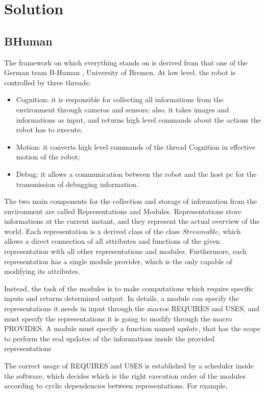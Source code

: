 \documentclass[a4paper, onecolumn, 12pt]{article}
\begin{document}
\section{Solution}
\label{sec:sol}

\subsection{BHuman}
The framework on which everything stands on is derived from that one of the
German team B-Human \cite{}, University of Bremen. At low level, the robot is 
controlled by three threads:
\begin{itemize}
    \item Cognition: it is responsible for collecting all informations from the 
    environment through cameras and sensors; also, it takes images and informations as input,
    and returns high level commands about the actions the robot has to execute;
    \item Motion: it converts high level commands of the thread Cognition in effective
    motion of the robot;
    \item Debug: it allows a communication between the robot and the host pc for the 
    transmission of debugging information.
\end{itemize}

The two main components for the collection and storage of information from the environment
are called Representations and Modules.
Representations store informations at the current instant, and they represent the actual overview
of the world. Each representation is a derived class of the class $Streamable$, which allows a 
direct connection of all attributes and functions of the given representation with all other
representations and modules. Furthermore, each representation has a single module provider, which
is the only capable of modifying its attributes.

Instead, the task of the modules is to make computations which require specific inputs and returns
determined output. In details, a module can specify the representations it needs in input through
the macros REQUIRES and USES, and must specify the representations it is going to modify through
the macro PROVIDES. A module must specify a function named $update$, that has the scope to 
perform the real updates of the informations inside the provided representations

The correct usage of REQUIRES and USES is established by a scheduler inside the software, which decides 
which is the right execution order of the modules according to cyclic dependencies between representations.
For example,
\end{document}
